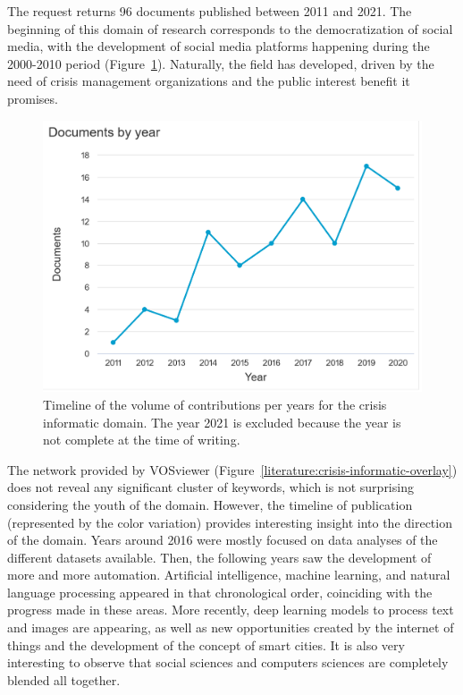 The request returns 96 documents published between 2011 and 2021.
The beginning of this domain of research corresponds to the democratization of social media, with the development of social media platforms happening during the 2000-2010 period (Figure~\ref{literature:crisis-informatic-hist}).
Naturally, the field has developed, driven by the need of crisis management organizations and the public interest benefit it promises.

\begin{figure}[htb]
    \includegraphics[width=\textwidth]{figures/chap-2/crisis-informatic-hist.pdf}
    \caption{Timeline of the volume of contributions per years for the crisis informatic domain. The year 2021 is excluded because the year is not complete at the time of writing.}
    \label{literature:crisis-informatic-hist}
\end{figure}

The network provided by VOSviewer (Figure~\ref{literature:crisis-informatic-overlay}) does not reveal any significant cluster of keywords, which is not surprising considering the youth of the domain.
However, the timeline of publication (represented by the color variation) provides interesting insight into the direction of the domain.
Years around 2016 were mostly focused on data analyses of the different datasets available.
Then, the following years saw the development of more and more automation.
Artificial intelligence, machine learning, and natural language processing appeared in that chronological order, coinciding with the progress made in these areas.
More recently, deep learning models to process text and images are appearing, as well as new opportunities created by the internet of things and the development of the concept of smart cities.
It is also very interesting to observe that social sciences and computers sciences are completely blended all together.

